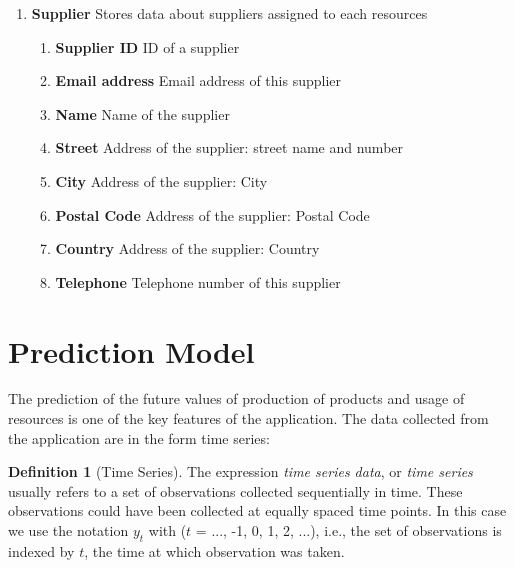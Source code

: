 \documentclass[a4paper,11pt,twoside]{report}
\theoremstyle{definition}
\newtheorem{definition}[theorem]{Definition}
\begin{document}
\begin{enumerate}
\item \textbf{Supplier} Stores data about suppliers assigned to each resources
\begin{enumerate}
\item \textbf{Supplier ID} ID of a supplier
\item \textbf{Email address} Email address of this supplier
\item \textbf{Name} Name of the supplier
\item \textbf{Street} Address of the supplier: street name and number
\item \textbf{City} Address of the supplier: City
\item \textbf{Postal Code} Address of the supplier: Postal Code
\item \textbf{Country} Address of the supplier: Country
\item \textbf{Telephone} Telephone number of this supplier
\end{enumerate}

\end{enumerate}
 
\section{Prediction Model}

The prediction of the future values of production of products and usage of resources is one of the key features of the application.
The data collected from the application are in the form time series:
\begin{definition}[Time Series]
The expression \textit{time series data}, or \textit{time series} usually refers to a set of observations collected sequentially in time. These observations could have been collected at equally spaced time points. In this case we use the notation $y_t$ with ($t$ = ..., -1, 0, 1, 2, ...), i.e., the set of observations is indexed by $t$, the time at which observation was taken.
\end{definition}
\end{document}
